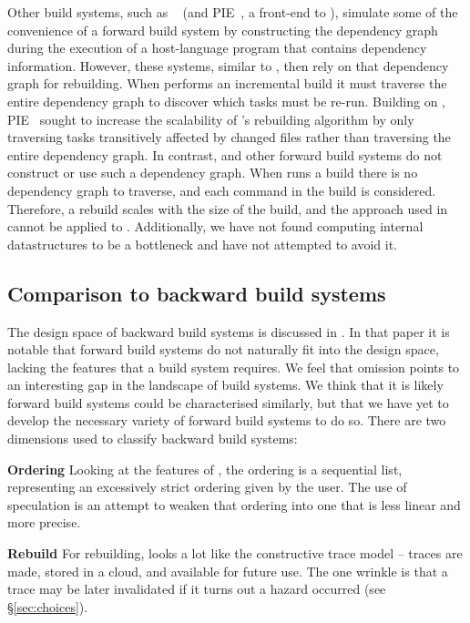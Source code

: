 Other build systems, such as \Pluto~\cite{erdweg2015sound} (and
\textsc{PIE}~\cite{Konat_2018,10.1145/3238147.3238196}, a front-end to
\Pluto), simulate some of the convenience of a forward build system by
constructing the dependency graph during the execution of a
host-language program that contains dependency information. However, these systems, similar to \Shake, then
rely on that dependency graph for rebuilding. When \Pluto performs an incremental build it must traverse the entire dependency graph to discover which tasks must be re-run.  Building on \Pluto, \textsc{PIE}~\cite{10.1145/3238147.3238196, Konat_2018} sought to increase the scalability of \Pluto's rebuilding algorithm by only traversing tasks transitively affected by changed files rather than traversing the entire dependency graph.
In contrast, \Rattle and
other forward build systems do not construct or use such a dependency
graph.  When \Rattle runs a build there is no dependency graph to traverse, and each command in the build is considered.  Therefore, a rebuild scales with the size of the build, and the approach used in \cite{10.1145/3238147.3238196} cannot be applied to \Rattle.  Additionally, we have not found computing internal datastructures to be a bottleneck and have not attempted to avoid it.

\subsection{Comparison to backward build systems}
\label{sec:remote_execution}

The design space of backward build systems is discussed in \cite{build_systems_a_la_carte}. In that paper it is notable that forward build systems do not naturally fit into the design space, lacking the features that a build system requires. We feel that omission points to an interesting gap in the landscape of build systems. We think that it is likely forward build systems could be characterised similarly, but that we have yet to develop the necessary variety of forward build systems to do so. There are two dimensions used to classify backward build systems:

\textbf{Ordering} Looking at the features of \Rattle, the ordering is a sequential list, representing an excessively strict ordering given by the user. The use of speculation is an attempt to weaken that ordering into one that is less linear and more precise.

\textbf{Rebuild} For rebuilding, \Rattle looks a lot like the constructive trace model -- traces are made, stored in a cloud, and available for future use. The one wrinkle is that a trace may be later invalidated if it turns out a hazard occurred (see \S\ref{sec:choices}).


